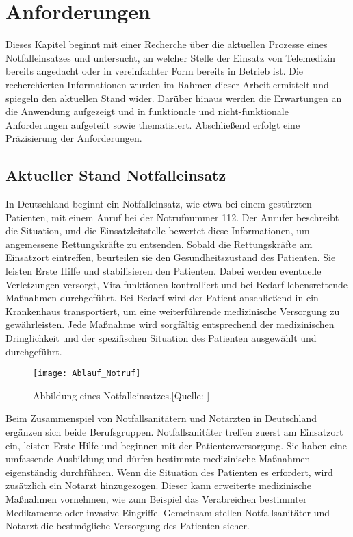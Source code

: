 \chapter{Anforderungen}

Dieses Kapitel beginnt mit einer Recherche über die aktuellen Prozesse 
eines Notfalleinsatzes und untersucht, an welcher Stelle der Einsatz von 
Telemedizin bereits angedacht oder in vereinfachter Form bereits in Betrieb ist. 
Die recherchierten Informationen wurden im Rahmen dieser 
Arbeit ermittelt und spiegeln den aktuellen Stand wider. 
Darüber hinaus werden die Erwartungen an die Anwendung 
aufgezeigt und in funktionale und nicht-funktionale 
Anforderungen aufgeteilt sowie thematisiert. Abschließend 
erfolgt eine Präzisierung der Anforderungen.

\section{Aktueller Stand Notfalleinsatz}

In Deutschland beginnt ein Notfalleinsatz, wie etwa bei einem gestürzten 
Patienten, mit einem Anruf bei der Notrufnummer 112. 
Der Anrufer beschreibt die Situation, und die 
Einsatzleitstelle bewertet diese Informationen, 
um angemessene Rettungskräfte zu entsenden. Sobald die 
Rettungskräfte am Einsatzort eintreffen, beurteilen sie 
den Gesundheitszustand des Patienten. Sie leisten Erste 
Hilfe und stabilisieren den Patienten. Dabei werden 
eventuelle Verletzungen versorgt, Vitalfunktionen 
kontrolliert und bei Bedarf lebensrettende Maßnahmen 
durchgeführt. Bei Bedarf wird der Patient anschließend in 
ein Krankenhaus transportiert, um eine weiterführende 
medizinische Versorgung zu gewährleisten. Jede Maßnahme 
wird sorgfältig entsprechend der medizinischen 
Dringlichkeit und der spezifischen Situation des Patienten 
ausgewählt und durchgeführt.\\

\begin{figure}[H]
    \centering
    \texttt{[image: Ablauf\_Notruf]}
    \caption{Abbildung eines Notfalleinsatzes.[Quelle: \cite{NotfallAblauf}]}
    \label{img:Ablauf_Notruf}
\end{figure}


Beim Zusammenspiel von Notfallsanitätern und Notärzten in 
Deutschland ergänzen sich beide Berufsgruppen. 
Notfallsanitäter treffen zuerst am Einsatzort ein, 
leisten Erste Hilfe und beginnen mit der Patientenversorgung. 
Sie haben eine umfassende Ausbildung und dürfen bestimmte 
medizinische Maßnahmen eigenständig durchführen. Wenn die 
Situation des Patienten es erfordert, wird zusätzlich ein Notarzt hinzugezogen. 
Dieser kann erweiterte medizinische Maßnahmen vornehmen, wie zum 
Beispiel das Verabreichen bestimmter Medikamente oder invasive Eingriffe. 
Gemeinsam stellen Notfallsanitäter und Notarzt die bestmögliche 
Versorgung des Patienten sicher.\\


